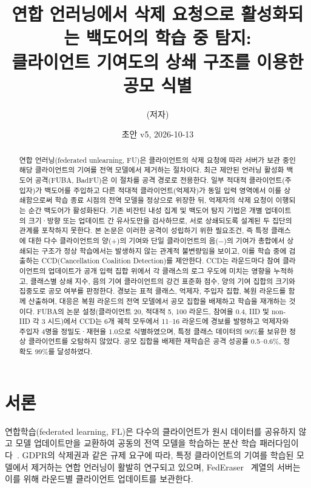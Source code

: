\documentclass[10pt,a4paper]{article}
\title{연합 언러닝에서 삭제 요청으로 활성화되는 백도어의 학습 중 탐지:\\클라이언트 기여도의 상쇄 구조를 이용한 공모 식별}
\author{(저자)}
\date{초안 v5, 2026-10-13}
\newcommand{\method}{CCD}
\begin{document}
\maketitle

\begin{abstract}
연합 언러닝(federated unlearning, FU)은 클라이언트의 삭제 요청에 따라 서버가 보관 중인 해당 클라이언트의 기여를 전역 모델에서 제거하는 절차이다. 최근 제안된 언러닝 활성화 백도어 공격(FUBA, BadFU)은 이 절차를 공격 경로로 전용한다. 일부 적대적 클라이언트(주입자)가 백도어를 주입하고 다른 적대적 클라이언트(억제자)가 동일 입력 영역에서 이를 상쇄함으로써 학습 종료 시점의 전역 모델을 정상으로 위장한 뒤, 억제자의 삭제 요청이 이행되는 순간 백도어가 활성화된다. 기존 비잔틴 내성 집계 및 백도어 탐지 기법은 개별 업데이트의 크기·방향 또는 업데이트 간 유사도만을 검사하므로, 서로 상쇄되도록 설계된 두 집단의 관계를 포착하지 못한다. 본 논문은 이러한 공격이 성립하기 위한 필요조건, 즉 특정 클래스에 대한 다수 클라이언트의 양(+)의 기여와 단일 클라이언트의 음(−)의 기여가 총합에서 상쇄되는 구조가 정상 학습에서는 발생하지 않는 관계적 불변량임을 보이고, 이를 학습 중에 검출하는 \method{}(Cancellation Coalition Detection)를 제안한다. \method{}는 라운드마다 참여 클라이언트의 업데이트가 공개 입력 집합 위에서 각 클래스의 로그 우도에 미치는 영향을 누적하고, 클래스별 상쇄 지수, 음의 기여 클라이언트의 강건 표준화 점수, 양의 기여 집합의 크기와 집중도로 공모 여부를 판정한다. 경보는 표적 클래스, 억제자, 주입자 집합, 복원 라운드를 함께 산출하며, 대응은 복원 라운드의 전역 모델에서 공모 집합을 배제하고 학습을 재개하는 것이다. FUBA의 논문 설정(클라이언트 20, 적대적 5, 100 라운드, 참여율 0.4, IID 및 non-IID 각 3 시드)에서 \method{}는 6개 궤적 모두에서 11--16 라운드에 경보를 발령하고 억제자와 주입자 4명을 정밀도·재현율 1.0으로 식별하였으며, 특정 클래스 데이터의 90\%를 보유한 정상 클라이언트를 오탐하지 않았다. 공모 집합을 배제한 재학습은 공격 성공률 0.5--0.6\%, 정확도 99\%를 달성하였다.
\end{abstract}

\section{서론}
연합학습(federated learning, FL)은 다수의 클라이언트가 원시 데이터를 공유하지 않고 모델 업데이트만을 교환하여 공동의 전역 모델을 학습하는 분산 학습 패러다임이다~\cite{krum}. GDPR의 삭제권과 같은 규제 요구에 따라, 특정 클라이언트의 기여를 학습된 모델에서 제거하는 연합 언러닝이 활발히 연구되고 있으며, FedEraser~\cite{federaser} 계열의 서버는 이를 위해 라운드별 클라이언트 업데이트를 보관한다.
\end{document}
